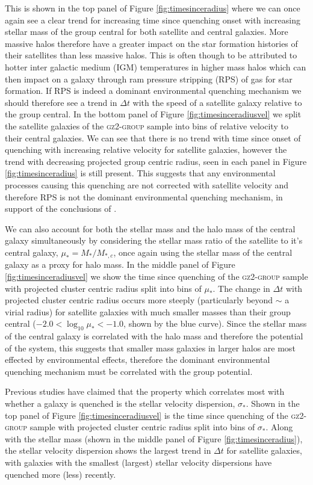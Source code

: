 \documentclass[useAMS,usenatbib]{mn2e}
\begin{document}
{This is shown in the top panel of Figure \ref{fig:timesinceradius} where we can once again see a clear trend for increasing time since quenching onset with increasing stellar mass of the group central for both satellite and central galaxies. More massive halos therefore have a greater impact on the star formation histories of their satellites than less massive halos. This is often though to be attributed to hotter inter galactic medium (IGM) temperatures in higher mass halos which can then impact on a galaxy through ram pressure stripping (RPS) of gas for star formation. If RPS is indeed a dominant environmental quenching mechanism we should therefore see a trend in $\Delta t$ with the speed of a satellite galaxy relative to the group central.  In the bottom panel of Figure \ref{fig:timesinceradiusvel} we split the satellite galaxies of the \textsc{gz2-group} sample into bins of relative velocity to their central galaxies. We can see that there is no trend with time since onset of quenching with increasing relative velocity for satellite galaxies, however the trend with decreasing projected group centric radius, seen in each panel in Figure \ref{fig:timesinceradius} is still present. This suggests that any environmental processes causing this quenching are not corrected with satellite velocity and therefore RPS is not the dominant environmental quenching mechanism, in support of the conclusions of \citet{Emerick16}.

We can also account for both the stellar mass and the halo mass of the central galaxy simultaneously by considering the stellar mass ratio of the satellite to it's central galaxy, $\mu_* = M_*/M_{*,c}$, once again using the stellar mass of the central galaxy as a proxy for halo mass. In the middle panel of Figure \ref{fig:timesinceradiusvel} we show the time since quenching of the \textsc{gz2-group} sample with projected cluster centric radius split into bins of $\mu_*$. The change in $\Delta t $ with projected cluster centric radius occurs more steeply (particularly beyond $\sim$ a virial radius) for satellite galaxies with much smaller masses than their group central ($-2.0 < \log_{10}\mu_* < -1.0$, shown by the blue curve). Since the stellar mass of the central galaxy is correlated with the halo mass and therefore the potential of the system, this suggests that smaller mass galaxies in larger halos are most effected by environmental effects, therefore the dominant environmental quenching mechanism must be correlated with the group potential. 

Previous studies have claimed that the property which correlates most with whether a galaxy is quenched is the stellar velocity dispersion, $\sigma_*$. Shown in the top panel of Figure \ref{fig:timesinceradiusvel} is the time since quenching of the \textsc{gz2-group} sample with projected cluster centric radius split into bins of $\sigma_*$. Along with the stellar mass (shown in the middle panel of Figure \ref{fig:timesinceradius}), the stellar velocity dispersion shows the largest trend in $\Delta t$  for satellite galaxies, with galaxies with the smallest (largest) stellar velocity dispersions have quenched more (less) recently. 

}
\end{document}
